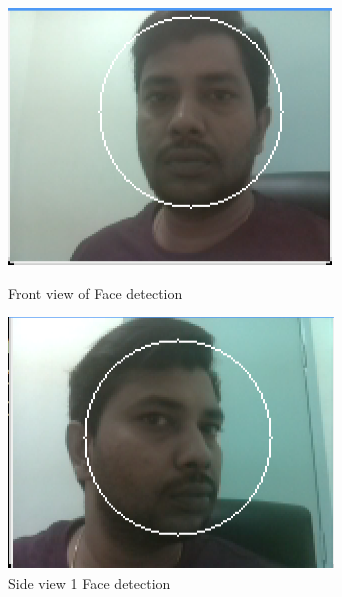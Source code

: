 \begin{figure}[htb]
  \centering
  \includegraphics[width=\columnwidth]{images/Face-detect-frontview.png}
  \caption{Front view of Face detection}\label{F:frontview}

  \centering
  \includegraphics[width=\columnwidth]{images/Face-detect-sideview1.png}
  \caption{Side view 1 Face detection}\label{F:sideview1}


\end{figure}
